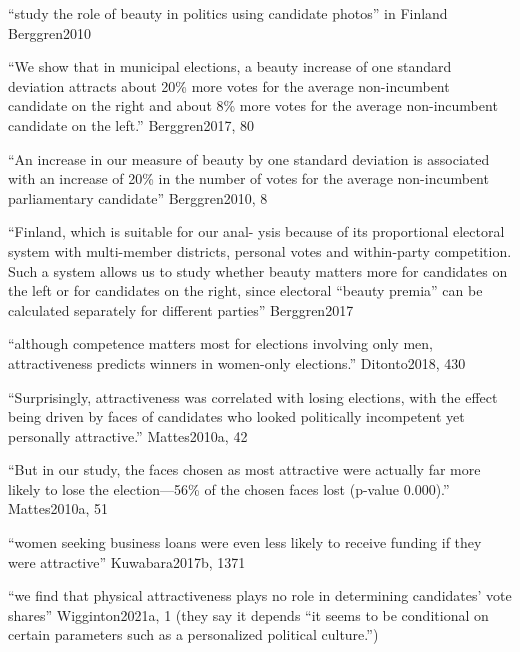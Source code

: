 
``study the role of beauty in politics using candidate photos'' in Finland Berggren2010

``We show that in municipal elections, a beauty increase of one standard deviation attracts about 20\% more votes for the average non-incumbent candidate on the right and about 8\% more votes for the average non-incumbent candidate on the left.'' Berggren2017, 80

``An increase in our measure of beauty by one standard deviation is associated with an increase of 20\% in the number of votes for the average non-incumbent parliamentary candidate'' Berggren2010, 8

``Finland, which is suitable for our anal- ysis because of its proportional electoral system with multi-member districts, personal votes and within-party competition. Such a system allows us to study whether beauty matters more for candidates on the left or for candidates on the right, since electoral “beauty premia” can be calculated separately for different parties'' Berggren2017


``although competence matters most for elections involving only men, attractiveness predicts winners in women-only elections.'' Ditonto2018, 430

``Surprisingly, attractiveness was correlated with losing elections, with the effect being driven by faces of candidates who looked politically incompetent yet personally attractive.'' Mattes2010a, 42

``But in our study, the faces chosen as most attractive were actually far more likely to lose the election—56\% of the chosen faces lost (p-value 0.000).'' Mattes2010a, 51

``women seeking business loans were even less likely to receive funding if they were attractive'' Kuwabara2017b, 1371

``we find that physical attractiveness plays no role in determining candidates’ vote shares'' Wigginton2021a, 1 (they say it depends ``it seems to be conditional on certain parameters such as a personalized political culture.'')